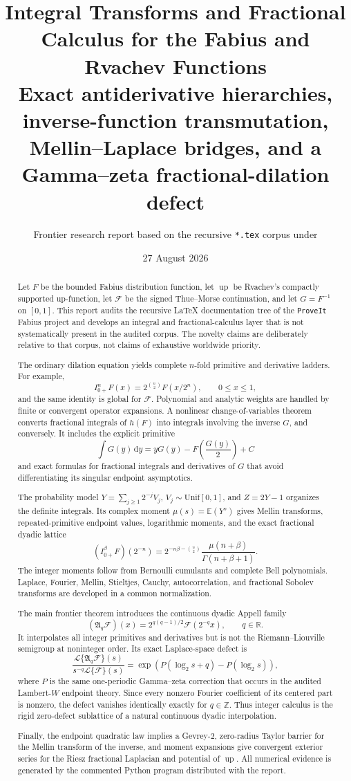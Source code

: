 \documentclass[11pt]{article}
\title{\textbf{Integral Transforms and Fractional Calculus for the Fabius and Rvachev Functions}\\[0.35em]
\large Exact antiderivative hierarchies, inverse-function transmutation, Mellin--Laplace bridges, and a Gamma--zeta fractional-dilation defect}
\author{Frontier research report based on the recursive \texttt{*.tex} corpus under\\
\small\repo}
\date{27 August 2026}
\theoremstyle{definition}
\theoremstyle{remark}
\newcommand{\R}{\mathbb R}
\newcommand{\Z}{\mathbb Z}
\newcommand{\E}{\mathbb E}
\newcommand{\dd}{\,\mathrm d}
\newcommand{\Up}{\operatorname{up}}
\newcommand{\Laplace}{\mathcal L}
\newcommand{\extF}{\mathcal F}
\newcommand{\Aop}{\mathfrak A}
\begin{document}
\maketitle

\begin{abstract}
Let $F$ be the bounded Fabius distribution function, let $\Up$ be Rvachev's compactly
supported up-function, let $\extF$ be the signed Thue--Morse continuation, and let
$G=F^{-1}$ on $[0,1]$.  This report audits the recursive LaTeX documentation tree of the
\texttt{ProveIt} Fabius project and develops an integral and fractional-calculus layer that
is not systematically present in the audited corpus.  The novelty claims are deliberately
relative to that corpus, not claims of exhaustive worldwide priority.

The ordinary dilation equation yields complete $n$-fold primitive and derivative ladders.
For example,
\[
 I_{0+}^{n}F(x)=2^{\binom n2}F(x/2^n),\qquad 0\le x\le1,
\]
and the same identity is global for $\extF$.  Polynomial and analytic weights are handled by
finite or convergent operator expansions.  A nonlinear change-of-variables theorem converts
fractional integrals of $h(F)$ into integrals involving the inverse $G$, and conversely.  It
includes the explicit primitive
\[
 \int G(y)\dd y=yG(y)-F\!\left(\frac{G(y)}2\right)+C
\]
and exact formulas for fractional integrals and derivatives of $G$ that avoid differentiating
its singular endpoint asymptotics.

The probability model
$Y=\sum_{j\ge1}2^{-j}V_j$, $V_j\sim\mathrm{Unif}[0,1]$, and $Z=2Y-1$ organizes the
definite integrals.  Its complex moment $\mu(s)=\E(Y^s)$ gives Mellin transforms,
repeated-primitive endpoint values, logarithmic moments, and the exact fractional dyadic
lattice
\[
 (I_{0+}^{\beta}F)(2^{-n})=
 2^{-n\beta-\binom n2}\frac{\mu(n+\beta)}{\Gamma(n+\beta+1)}.
\]
The integer moments follow from Bernoulli cumulants and complete Bell polynomials.
Laplace, Fourier, Mellin, Stieltjes, Cauchy, autocorrelation, and fractional Sobolev transforms
are developed in a common normalization.

The main frontier theorem introduces the continuous dyadic Appell family
\[
 (\Aop_q\extF)(x)=2^{q(q-1)/2}\extF(2^{-q}x),\qquad q\in\R.
\]
It interpolates all integer primitives and derivatives but is not the
Riemann--Liouville semigroup at noninteger order.  Its exact Laplace-space defect is
\[
 \frac{\Laplace\{\Aop_q\extF\}(s)}{s^{-q}\Laplace\{\extF\}(s)}
 =\exp\!\left(P(\log_2s+q)-P(\log_2s)\right),
\]
where $P$ is the same one-periodic Gamma--zeta correction that occurs in the audited
Lambert-$W$ endpoint theory.  Since every nonzero Fourier coefficient of its centered part is
nonzero, the defect vanishes identically exactly for $q\in\Z$.  Thus integer calculus is the
rigid zero-defect sublattice of a natural continuous dyadic interpolation.

Finally, the endpoint quadratic law implies a Gevrey-2, zero-radius Taylor barrier for the
Mellin transform of the inverse, and moment expansions give convergent exterior series for the
Riesz fractional Laplacian and potential of $\Up$.  All numerical evidence is generated by the
commented Python program distributed with the report.
\end{abstract}
\end{document}
